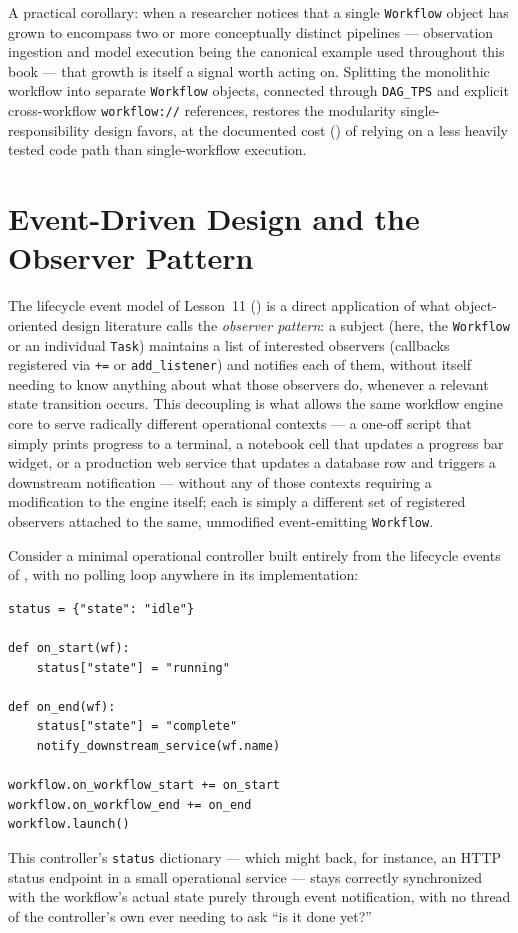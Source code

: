 \begin{practicebox}
A practical corollary: when a researcher notices that a single
\texttt{Workflow} object has grown to encompass two or more conceptually
distinct pipelines --- observation ingestion and model execution being the
canonical example used throughout this book --- that growth is itself a
signal worth acting on. Splitting the monolithic workflow into separate
\texttt{Workflow} objects, connected through \texttt{DAG\_TPS} and explicit
cross-workflow \texttt{workflow://} references, restores the modularity
single-responsibility design favors, at the documented cost
() of relying on a less heavily tested code path than
single-workflow execution.
\end{practicebox}

\section{Event-Driven Design and the Observer Pattern}

The lifecycle event model of Lesson~11 () is a
direct application of what object-oriented design literature calls the
\emph{observer pattern}: a subject (here, the \texttt{Workflow} or an
individual \texttt{Task}) maintains a list of interested observers
(callbacks registered via \texttt{+=} or \texttt{add\_listener}) and
notifies each of them, without itself needing to know anything about what
those observers do, whenever a relevant state transition occurs. This
decoupling is what allows the same workflow engine core to serve radically
different operational contexts --- a one-off script that simply prints
progress to a terminal, a notebook cell that updates a progress bar widget,
or a production web service that updates a database row and triggers a
downstream notification --- without any of those contexts requiring a
modification to the engine itself; each is simply a different set of
registered observers attached to the same, unmodified event-emitting
\texttt{Workflow}.

\begin{example}
Consider a minimal operational controller built entirely from the lifecycle
events of , with no polling loop anywhere in its
implementation:
\begin{lstlisting}
status = {"state": "idle"}

def on_start(wf):
    status["state"] = "running"

def on_end(wf):
    status["state"] = "complete"
    notify_downstream_service(wf.name)

workflow.on_workflow_start += on_start
workflow.on_workflow_end += on_end
workflow.launch()
\end{lstlisting}
This controller's \texttt{status} dictionary --- which might back, for
instance, an HTTP status endpoint in a small operational service --- stays
correctly synchronized with the workflow's actual state purely through
event notification, with no thread of the controller's own ever needing to
ask ``is it done yet?''
\end{example}

